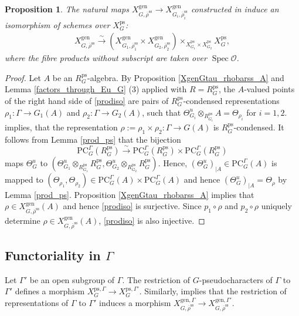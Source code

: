 \documentclass{amsart}
\newtheorem{prop}{Proposition}[section]
\theoremstyle{definition}
\theoremstyle{remark}
\DeclareMathOperator{\Spec}{Spec}
\newcommand{\OO}{\mathcal O}
\newcommand{\rhobar}{\overline{\rho}}
\newcommand{\ps}{\mathrm{ps}}
\newcommand{\gen}{\mathrm{gen}}
\newcommand{\RpsG}{R^{\ps}_G}
\newcommand{\rhobarss}{\rhobar^{\mathrm{ss}}}
\newcommand{\PC}{\mathrm{PC}}
\newcommand{\eqto}{\xrightarrow{\sim}}
\begin{document}
\begin{prop}\label{products} The  natural maps  $X^{\gen}_{G, \rhobarss} \to X^{\gen}_{G_i, \rhobarss_i}$ constructed in  induce an isomorphism of schemes over $X^{\ps}_G$: 
\begin{align}
    X^{\gen}_{G, \rhobarss} \eqto ( X^{\gen}_{G_1, \rhobarss_1}\times X^{\gen}_{G_2, \rhobarss_2})\times_{X^{\ps}_{G_1}\times X^{\ps}_{G_2}} X^{\ps}_G, \label{prodiso}
\end{align}
where the fibre products without subscript are taken over $\Spec \OO$.
\end{prop}

\begin{proof}
    Let $A$ be an $\RpsG$-algebra. By Proposition \ref{XgenGtau_rhobarss_A} and Lemma \ref{factors_through_Eu_G} (3) applied with 
    $R=\RpsG$,  the $A$-valued points of the right hand side of \eqref{prodiso} are pairs of 
    $\RpsG$-condensed representations $\rho_1 : \Gamma \to G_1(A)$ and $\rho_2 : \Gamma \to G_2(A)$, 
    such that $\Theta^u_{G_i} \otimes_{R^{\ps}_{G_i}} A = \Theta_{\rho_i}$ for $i=1,2$. 
     implies, that the representation $\rho := \rho_1 \times \rho_2 : \Gamma \to G(A)$ is $\RpsG$-condensed. It follows from Lemma \ref{prod_ps} that the 
    bijection $$\PC^{\Gamma}_{G}(\RpsG)\eqto
    \PC^{\Gamma}_{G}(\RpsG)\times \PC^{\Gamma}_{G}(\RpsG)$$ maps 
    $\Theta^u_G$ to $(\Theta^u_{G_1}\otimes_{R^{\ps}_{G_1}} \RpsG,
    \Theta^u_{G_2}\otimes_{R^{\ps}_{G_2}} \RpsG)$. Hence, $(\Theta^u_G)_{|A}\in \PC^{\Gamma}_{G}(A)$
    is mapped to $(\Theta_{\rho_1}, \Theta_{\rho_2})\in \PC^{\Gamma}_{G}(A)\times \PC^{\Gamma}_{G}(A)$ and hence $(\Theta^u_G)_{|A}=\Theta_{\rho}$ by Lemma \ref{prod_ps}. Proposition \ref{XgenGtau_rhobarss_A}
    implies that $\rho\in  X^{\gen}_{G, \rhobarss}(A)$ and hence \eqref{prodiso} is surjective. 
    Since $p_1\circ \rho$ and $p_2\circ \rho$ uniquely determine $\rho\in  X^{\gen}_{G, \rhobarss}(A)$, \eqref{prodiso} is 
    also injective. 
    \end{proof}

\subsection{\texorpdfstring{Functoriality in $\Gamma$}{Functoriality in Gamma F}}\label{funct_Gamma}
Let $\Gamma'$ be an open subgroup of $\Gamma$. The restriction of $G$-pseudocharacters of $\Gamma$ to $\Gamma'$ defines 
a morphism $X^{\ps, \Gamma}_{G}\rightarrow X^{\ps,\Gamma'}_{G}$. Similarly,  implies that the restriction of representations
of $\Gamma$ to $\Gamma'$ induces a morphism $X^{\gen,\Gamma}_{G, \rhobarss}\rightarrow X^{\gen,\Gamma'}_{G, \rhobarss}$.
\end{document}
